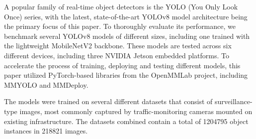 A popular family of real-time object detectors is the YOLO (You Only Look Once)
series, with the latest, state-of-the-art YOLOv8 model architecture being the
primary focus of this paper. To thoroughly evaluate its performance, we
benchmark several YOLOv8 models of different sizes, including one trained with
the lightweight MobileNetV2 backbone. These models are tested across six
different devices, including three NVIDIA Jetson embedded platforms. To
accelerate the process of training, deploying and testing different models, this
paper utilized PyTorch-based libraries from the OpenMMLab project, including
MMYOLO and MMDeploy.

The models were trained on several different datasets that consist of
surveillance-type images, most commonly captured by traffic-monitoring cameras
mounted on existing infrastructure. The datasets combined contain a total of
\num{1204795} object instances in \num{218821} images.


